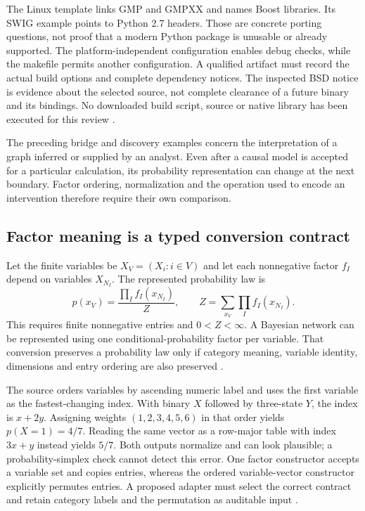 The Linux template links GMP and GMPXX and names Boost libraries. Its SWIG
example points to Python 2.7 headers. Those are concrete porting questions,
not proof that a modern Python package is unusable or already supported.
The platform-independent configuration enables debug checks, while the
makefile permits another configuration. A qualified artifact must record
the actual build options and complete dependency notices. The inspected BSD
notice is evidence about the selected source, not complete clearance of a
future binary and its bindings. No downloaded build script, source or native
library has been executed for this review \cite{exec24_libdai_source}.

The preceding bridge and discovery examples concern the interpretation of a
graph inferred or supplied by an analyst. Even after a causal model is
accepted for a particular calculation, its probability representation can
change at the next boundary. Factor ordering, normalization and the operation
used to encode an intervention therefore require their own comparison.

\subsection{Factor meaning is a typed conversion contract}
Let the finite variables be $X_V=(X_i:i\in V)$ and let each nonnegative factor
$f_I$ depend on variables $X_{N_I}$. The represented probability law is
\[
 p(x_V)=\frac{\prod_I f_I(x_{N_I})}{Z},\qquad
 Z=\sum_{x_V}\prod_I f_I(x_{N_I}).
\]
This requires finite nonnegative entries and $0<Z<\infty$. A Bayesian network
can be represented using one conditional-probability factor per variable.
That conversion preserves a probability law only if category meaning,
variable identity, dimensions and entry ordering are also preserved
\cite{exec24_libdai_paper,exec24_libdai_source}.

The source orders variables by ascending numeric label and uses the first
variable as the fastest-changing index. With binary $X$ followed by
three-state $Y$, the index is $x+2y$. Assigning weights $(1,2,3,4,5,6)$ in
that order yields $p(X=1)=4/7$. Reading the same vector as a row-major table
with index $3x+y$ instead yields $5/7$. Both outputs normalize and can look
plausible; a probability-simplex check cannot detect this error. One factor
constructor accepts a variable set and copies entries, whereas the ordered
variable-vector constructor explicitly permutes entries. A proposed adapter
must select the correct contract and retain category labels and the
permutation as auditable input \cite{exec24_libdai_source,exec24_libdai_choice}.

